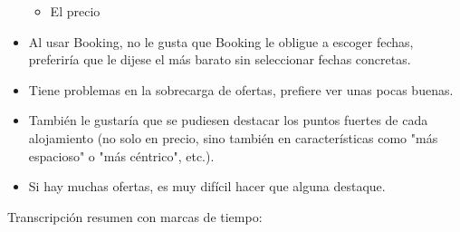 \begin{itemize}
\begin{itemize}
        \item El precio
    \end{itemize}
    \item Al usar Booking, no le gusta que Booking le obligue a escoger fechas, preferiría que le dijese el más barato sin seleccionar fechas concretas.
    \item Tiene problemas en la sobrecarga de ofertas, prefiere ver unas pocas buenas.
    \item También le gustaría que se pudiesen destacar los puntos fuertes de cada alojamiento (no solo en precio, sino también en características como "más espacioso" o "más céntrico", etc.).
    \item Si hay muchas ofertas, es muy difícil hacer que alguna destaque.
\end{itemize}


Transcripción resumen con marcas de tiempo:

